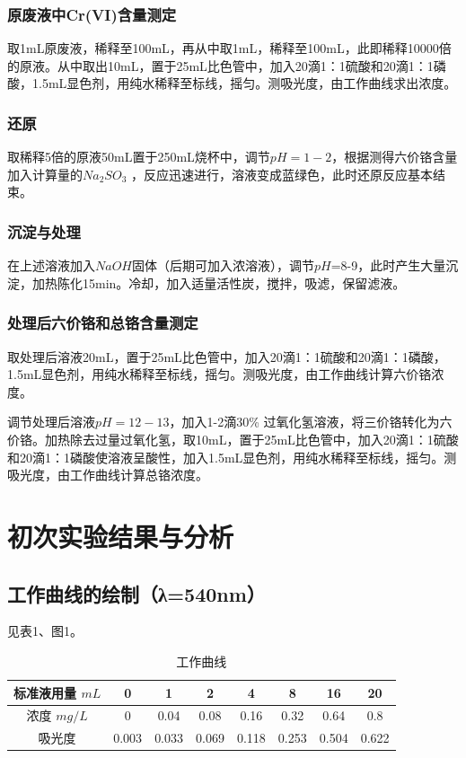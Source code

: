 \documentclass[UTF8,a4paper,11pt,twocolumn]{ctexart}
\begin{document}
\subsubsection{原废液中Cr(VI)含量测定}
取1mL原废液，稀释至100mL，再从中取1mL，稀释至100mL，此即稀释10000倍的原液。从中取出10mL，置于25mL比色管中，加入20滴1：1硫酸和20滴1：1磷酸，1.5mL显色剂，用纯水稀释至标线，摇匀。测吸光度，由工作曲线求出浓度。
\subsubsection{还原}
取稀释5倍的原液50mL置于250mL烧杯中，调节$pH=1-2$，根据测得六价铬含量加入计算量的$Na_2SO_3$ ，反应迅速进行，溶液变成蓝绿色，此时还原反应基本结束。
\subsubsection{沉淀与处理}
在上述溶液加入$NaOH$固体（后期可加入浓溶液），调节$pH$=8-9，此时产生大量沉淀，加热陈化15min。冷却，加入适量活性炭，搅拌，吸滤，保留滤液。
\subsubsection{处理后六价铬和总铬含量测定}
取处理后溶液20mL，置于25mL比色管中，加入20滴1：1硫酸和20滴1：1磷酸，1.5mL显色剂，用纯水稀释至标线，摇匀。测吸光度，由工作曲线计算六价铬浓度。

调节处理后溶液$pH=12-13$，加入1-2滴30\% 过氧化氢溶液，将三价铬转化为六价铬。加热除去过量过氧化氢，取10mL，置于25mL比色管中，加入20滴1：1硫酸和20滴1：1磷酸使溶液呈酸性，加入1.5mL显色剂，用纯水稀释至标线，摇匀。测吸光度，由工作曲线计算总铬浓度。
\section{初次实验结果与分析}
\subsection{工作曲线的绘制（λ=540nm）}
见表1、图1。

\begin{table}[h]
\centering
\begin{tabular}{cccccccc}
\toprule
标准液用量 $mL$&0&1&2&4&8&16&20\\
\midrule
浓度 $mg/L$&0&0.04&0.08&0.16&0.32&0.64&0.8\\
吸光度&0.003&0.033&0.069&0.118&0.253&0.504&0.622\\
\bottomrule
\end{tabular}
\caption{工作曲线}
\end{table}
\end{document}

